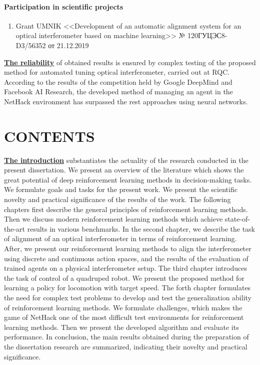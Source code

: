 \paragraph{Participation in scientific projects}
\begin{enumerate}[labelindent=3pt, labelsep=10pt, topsep=10pt, itemsep=5pt]
    \item Grant UMNIK <<Development of an automatic alignment system for an optical interferometer based on machine learning>> № 120ГУЦЭС8-D3/56352 от 21.12.2019

\end{enumerate}


\underline{\textbf{The reliability}} of obtained results is ensured by complex testing of the proposed method for automated tuning optical interferometer, carried out at RQC. According to the results of the competition held by Google DeepMind and Facebook AI Research, the developed method of managing an agent in the NetHack environment has surpassed the rest approaches using neural networks.


\section*{\centering CONTENTS}
\underline{\textbf{The introduction}} substantiates the actuality of the research conducted in the present dissertation. We present an overview of the literature which shows the great potential of deep reinforcement learning methods in decision-making tasks. We formulate goals and tasks for the present work. We present the scientific novelty and practical significance of the results of the work. The following chapters first describe the general principles of reinforcement learning methods. Then we discuss modern reinforcement learning methods which achieve state-of-the-art results in various benchmarks. In the second chapter, we describe the task of alignment of an optical interferometer in terms of reinforcement learning. After, we present our reinforcement learning methods to align the interferometer using discrete and continuous action spaces, and the results of the evaluation of trained agents on a physical interferometer setup. The third chapter introduces the task of control of a quadruped robot. We present the proposed method for learning a policy for locomotion with target speed. The forth chapter formulates the need for complex test problems to develop and test the generalization ability of reinforcement learning methods. We formulate challenges, which makes the game of NetHack one of the most difficult test environments for reinforcement learning methods. Then we present the developed algorithm and evaluate its performance. In conclusion, the main results obtained during the preparation of the dissertation research are summarized, indicating their novelty and practical significance.


